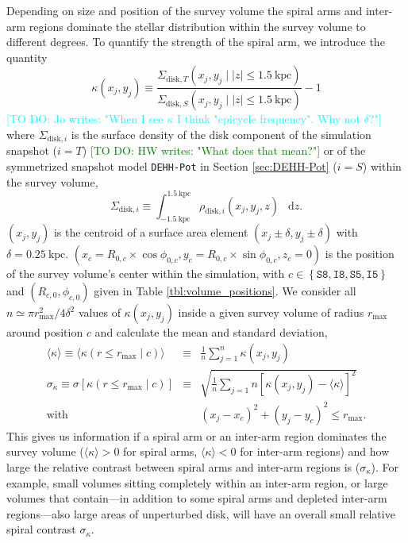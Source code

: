 \documentclass[iop,revtex4,numberedappendix,appendixfloats]{emulateapj}
\newcommand*\diff{\mathop{}\!\mathrm{d}}
\newcommand{\HW}[1]{\textcolor{Green}{#1}}
\newcommand{\Jo}[1]{\textcolor{Cyan}{#1}}
\begin{document}
Depending on size and position of the survey volume the spiral arms and inter-arm regions dominate the stellar distribution within the survey volume to different degrees. To quantify the strength of the spiral arm, we introduce the quantity
\begin{equation}
\kappa(x_j,y_j) \equiv \frac{\Sigma_{\text{disk},T}(x_j,y_j \mid |z|\leq 1.5~\text{kpc})}{\Sigma_{\text{disk},S}(x_j,y_j \mid |z| \leq1.5~\text{kpc})} -1\label{eq:kappa_definition}
\end{equation}
\Jo{[TO DO: Jo writes: "When I see $\kappa$ I think "epicycle frequency". Why not $\delta$?"]}
where $\Sigma_{\text{disk},i}$ is the surface density of the disk component  of the simulation snapshot ($i=T$) \HW{[TO DO: HW writes: "What does that mean?"]} or of the symmetrized snapshot model \texttt{DEHH-Pot} in Section \ref{sec:DEHH-Pot} ($i=S$) within the survey volume,
\begin{equation}
\Sigma_{\text{disk},i} \equiv \int_{-1.5~\text{kpc}}^{1.5~\text{kpc}} \rho_{\text{disk},i}(x_j,y_j,z) \ \diff z.
\end{equation}
$(x_j,y_j)$ is the centroid of a surface area element $(x_j\pm\delta,y_j\pm \delta)$ with $\delta=0.25~\text{kpc}$. $(x_c=R_{0,c}\times\cos \phi_{0,c},y_c=R_{0,c}\times\sin \phi_{0,c},z_c=0)$ is the position of the survey volume's center within the simulation, with $c\in\left\{ \texttt{S8},\texttt{I8},\texttt{S5},\texttt{I5}\right\}$ and $(R_{c,0},\phi_{c,0})$ given in Table \ref{tbl:volume_positions}. We consider all $n \simeq \pi r_\text{max}^2/4\delta^2$ values of $\kappa(x_j,y_j)$ inside a given survey volume of radius $r_\text{max}$ around position $c$ and calculate the mean and standard deviation,
\begin{eqnarray}
\langle \kappa \rangle \equiv \langle \kappa (r \leq r_\text{max} \mid c) \rangle &\equiv & \frac 1n \sum_{j=1}^n \kappa(x_j,y_j)\label{eq:mean_kappa}\\
\sigma_\kappa \equiv \sigma[\kappa(r \leq r_\text{max} \mid c)]  &\equiv &  \sqrt{\frac 1n \sum_{j=1}{n} \left[ \kappa(x_j,y_j) -  \langle \kappa \rangle \right]^2}\label{eq:std_kappa}\\
 \text{with } && (x_j-x_c)^2 + (y_j-y_c)^2 \leq r_\text{max}. \nonumber
\end{eqnarray}
This gives us information if a spiral arm or an inter-arm region dominates the survey volume ($\langle \kappa \rangle > 0$ for spiral arms, $\langle \kappa \rangle < 0$ for inter-arm regions) and how large the relative contrast between spiral arms and inter-arm regions is ($\sigma_\kappa$). For example, small volumes sitting completely within an inter-arm region, or large volumes that contain---in addition to some spiral arms and depleted inter-arm regions---also large areas of unperturbed disk, will have an overall small relative spiral contrast $\sigma_\kappa$.
\end{document}
